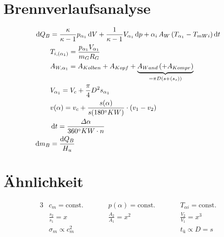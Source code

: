 \documentclass[english,threecolumn,color]{latex4ei/latex4ei_sheet}
\begin{document}
\section{Brennverlaufsanalyse}
\begin{sectionbox}
	\begin{align*}
		\diff Q_B &= \frac{\kappa}{\kappa -1}p_{\alpha_1} \diff V+\frac{1}{\kappa -1}V_{\alpha_1} \diff p+\alpha_i \, A_{W} \left( T_{\alpha_1}-T_{mWi} \right)\diff t\\
		 &T_{i,(\alpha_1)}=\frac{p_{\alpha_1} V_{\alpha_1}}{m_G R_G}\\
		&A_{W,\alpha_1}=A_{Kolben}+A_{Kopf}+\underbrace{A_{Wand}\,(+A_{Kompr})}_{=\pi D (s+(s_s))}\\
		&V_{\alpha_1}= V_c + \frac{\pi}{4}D^2 s_{\alpha_1}\\
		&v(\alpha)= v_c+ \frac{s(\alpha)}{s(180^\circ KW) }\cdot\left( v_1-v_2 \right)\\
		&\diff t= \frac{\varDelta \alpha}{360^{\circ}KW \cdot n}\\
		\diff m_B &=\frac{\diff Q_B}{H_u}
	\end{align*}

\end{sectionbox}
\columnbreak
\section{Ähnlichkeit}
\begin{sectionbox}
	\begin{alignat*}{3}
		&c_m =\text{const.}\qquad && p(\alpha)=\text{const.}\qquad && T_{\alpha i}=\text{const.}\\
		&\frac{s_2}{s_1}= x \quad &&	\frac{A_2}{A_1}=x^2 \quad&& \frac{V_2}{V_1}=x^3\\
	   	&\sigma_m \propto c_m^2 \quad &&   && t_{\text{ü}}\propto D=s \\
	\end{alignat*}
\end{sectionbox}
\end{document}
